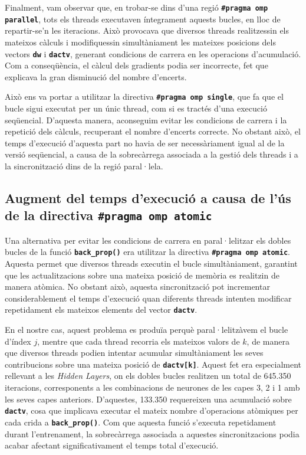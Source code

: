 \documentclass{article}
\begin{document}
\bigskip

\noindent Finalment, vam observar que, en trobar-se dins d'una regió \textbf{\texttt{\#pragma omp parallel}}, tots els threads executaven íntegrament aquests bucles, en lloc de repartir-se'n les iteracions. Això provocava que diversos threads realitzessin els mateixos càlculs i modifiquessin simultàniament les mateixes posicions dels vectors \textbf{\texttt{dw}} i \textbf{\texttt{dactv}}, generant condicions de carrera en les operacions d'acumulació. Com a conseqüència, el càlcul dels gradients podia ser incorrecte, fet que explicava la gran disminució del nombre d'encerts.

\bigskip

\noindent Això ens va portar a utilitzar la directiva \textbf{\texttt{\#pragma omp single}}, que fa que el bucle sigui executat per un únic thread, com si es tractés d'una execució seqüencial. D'aquesta manera, aconseguim evitar les condicions de carrera i la repetició dels càlculs, recuperant el nombre d'encerts correcte. No obstant això, el temps d'execució d'aquesta part no havia de ser necessàriament igual al de la versió seqüencial, a causa de la sobrecàrrega associada a la gestió dels threads i a la sincronització dins de la regió paral·lela.



\subsection{Augment del temps d'execució a causa de l'ús de la directiva \textbf{\texttt{\#pragma omp atomic}}}
\label{sec:error_spike2}


\noindent Una alternativa per evitar les condicions de carrera en paral·lelitzar els dobles bucles de la funció \textbf{\texttt{back\_prop()}} era utilitzar la directiva \textbf{\texttt{\#pragma omp atomic}}. Aquesta permet que diversos threads executin el bucle simultàniament, garantint que les actualitzacions sobre una mateixa posició de memòria es realitzin de manera atòmica. No obstant això, aquesta sincronització pot incrementar considerablement el temps d'execució quan diferents threads intenten modificar repetidament els mateixos elements del vector \textbf{\texttt{dactv}}.

\bigskip

\noindent En el nostre cas, aquest problema es produïa perquè paral·lelitzàvem el bucle d'índex $j$, mentre que cada thread recorria els mateixos valors de $k$, de manera que diversos threads podien intentar acumular simultàniament les seves contribucions sobre una mateixa posició de \textbf{\texttt{dactv[k]}}. Aquest fet era especialment rellevant a les \textit{Hidden Layers}, on els dobles bucles realitzen un total de 645.350 iteracions, corresponents a les combinacions de neurones de les capes 3, 2 i 1 amb les seves capes anteriors. D'aquestes, 133.350 requereixen una acumulació sobre \textbf{\texttt{dactv}}, cosa que implicava executar el mateix nombre d'operacions atòmiques per cada crida a \textbf{\texttt{back\_prop()}}. Com que aquesta funció s'executa repetidament durant l'entrenament, la sobrecàrrega associada a aquestes sincronitzacions podia acabar afectant significativament el temps total d'execució.
\end{document}
